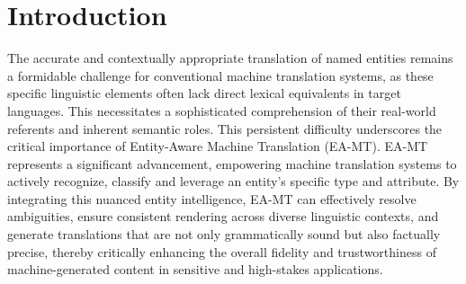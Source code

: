 \documentclass[final]{ecai}
\begin{document}
\section{Introduction}
\label{sec:intro}
The accurate and contextually appropriate translation of named entities remains a formidable challenge
for conventional machine translation systems, as these specific linguistic elements often lack direct
lexical equivalents in target languages. This necessitates a sophisticated comprehension of their real-world
referents and inherent semantic roles. This persistent difficulty underscores the critical importance of Entity-Aware
Machine Translation (EA-MT). EA-MT represents a significant advancement, empowering machine translation systems to actively
recognize, classify and leverage an entity's specific type and attribute. By integrating this nuanced entity intelligence, 
EA-MT can effectively resolve ambiguities, ensure consistent rendering across diverse linguistic contexts, 
and generate translations that are not only grammatically sound but also factually precise, 
thereby critically enhancing the overall fidelity and trustworthiness of machine-generated content
 in sensitive and high-stakes applications.

\end{document}
